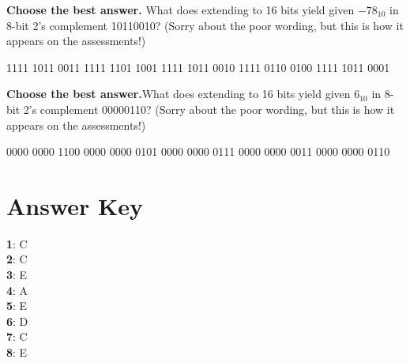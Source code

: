 \documentclass{exam}
\newcommand{\itemSpace}{24pt} %
\begin{document}
\begin{questions}
\vspace{\itemSpace}
\question \textbf{Choose the best answer.}
        What does extending to 16 bits yield given $-78_{10}$ in 8-bit 2’s complement 10110010?
        (Sorry about the poor wording, but this is how it appears on the assessments!)
		\begin{choices}
			 1111 1011 0011
			 1111 1101 1001
			 1111 1011 0010
			 1111 0110 0100
			 1111 1011 0001
		\end{choices}%
\vspace{\itemSpace}
\question \textbf{Choose the best answer.}What does extending to 16 bits yield given $6_{10}$ in 8-bit 2’s complement 00000110?
    (Sorry about the poor wording, but this is how it appears on the assessments!)
		\begin{choices}
			 0000 0000 1100
			 0000 0000 0101
			 0000 0000 0111
			 0000 0000 0011
			 0000 0000 0110
		\end{choices}%
\newpage

\section*{Answer Key}
    \textbf{1}: C \\
    \textbf{2}: C \\
    \textbf{3}: E \\
    \textbf{4}: A \\
    \textbf{5}: E \\
    \textbf{6}: D \\
    \textbf{7}: C \\
    \textbf{8}: E \\
    
\end{questions}
\end{document}
